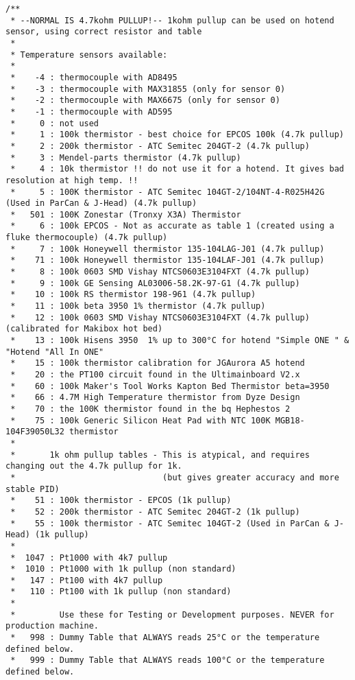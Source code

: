 \begin{lstlisting}[caption = キャプション, label = ラベル]
/**
 * --NORMAL IS 4.7kohm PULLUP!-- 1kohm pullup can be used on hotend sensor, using correct resistor and table
 *
 * Temperature sensors available:
 *
 *    -4 : thermocouple with AD8495
 *    -3 : thermocouple with MAX31855 (only for sensor 0)
 *    -2 : thermocouple with MAX6675 (only for sensor 0)
 *    -1 : thermocouple with AD595
 *     0 : not used
 *     1 : 100k thermistor - best choice for EPCOS 100k (4.7k pullup)
 *     2 : 200k thermistor - ATC Semitec 204GT-2 (4.7k pullup)
 *     3 : Mendel-parts thermistor (4.7k pullup)
 *     4 : 10k thermistor !! do not use it for a hotend. It gives bad resolution at high temp. !!
 *     5 : 100K thermistor - ATC Semitec 104GT-2/104NT-4-R025H42G (Used in ParCan & J-Head) (4.7k pullup)
 *   501 : 100K Zonestar (Tronxy X3A) Thermistor
 *     6 : 100k EPCOS - Not as accurate as table 1 (created using a fluke thermocouple) (4.7k pullup)
 *     7 : 100k Honeywell thermistor 135-104LAG-J01 (4.7k pullup)
 *    71 : 100k Honeywell thermistor 135-104LAF-J01 (4.7k pullup)
 *     8 : 100k 0603 SMD Vishay NTCS0603E3104FXT (4.7k pullup)
 *     9 : 100k GE Sensing AL03006-58.2K-97-G1 (4.7k pullup)
 *    10 : 100k RS thermistor 198-961 (4.7k pullup)
 *    11 : 100k beta 3950 1% thermistor (4.7k pullup)
 *    12 : 100k 0603 SMD Vishay NTCS0603E3104FXT (4.7k pullup) (calibrated for Makibox hot bed)
 *    13 : 100k Hisens 3950  1% up to 300°C for hotend "Simple ONE " & "Hotend "All In ONE"
 *    15 : 100k thermistor calibration for JGAurora A5 hotend
 *    20 : the PT100 circuit found in the Ultimainboard V2.x
 *    60 : 100k Maker's Tool Works Kapton Bed Thermistor beta=3950
 *    66 : 4.7M High Temperature thermistor from Dyze Design
 *    70 : the 100K thermistor found in the bq Hephestos 2
 *    75 : 100k Generic Silicon Heat Pad with NTC 100K MGB18-104F39050L32 thermistor
 *
 *       1k ohm pullup tables - This is atypical, and requires changing out the 4.7k pullup for 1k.
 *                              (but gives greater accuracy and more stable PID)
 *    51 : 100k thermistor - EPCOS (1k pullup)
 *    52 : 200k thermistor - ATC Semitec 204GT-2 (1k pullup)
 *    55 : 100k thermistor - ATC Semitec 104GT-2 (Used in ParCan & J-Head) (1k pullup)
 *
 *  1047 : Pt1000 with 4k7 pullup
 *  1010 : Pt1000 with 1k pullup (non standard)
 *   147 : Pt100 with 4k7 pullup
 *   110 : Pt100 with 1k pullup (non standard)
 *
 *         Use these for Testing or Development purposes. NEVER for production machine.
 *   998 : Dummy Table that ALWAYS reads 25°C or the temperature defined below.
 *   999 : Dummy Table that ALWAYS reads 100°C or the temperature defined below.

\end{lstlisting}
